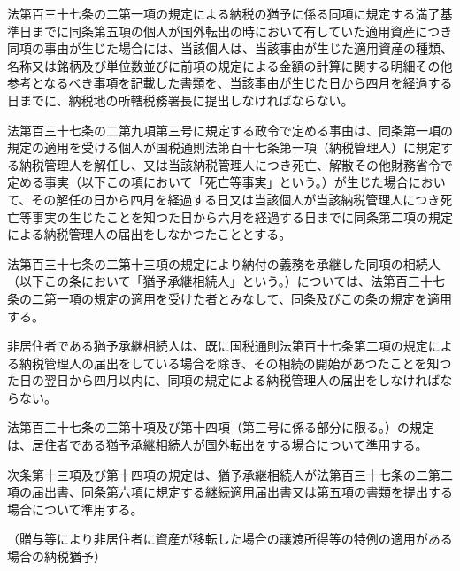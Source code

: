 \documentclass[twocolumn,a4j,10pt]{ltjtarticle}
\begin{document}
\begin{description}
\begin{description}
\end{description}
\item[\rensuji{5}]法第百三十七条の二第一項の規定による納税の猶予に係る同項に規定する満了基準日までに同条第五項の個人が国外転出の時において有していた適用資産につき同項の事由が生じた場合には、当該個人は、当該事由が生じた適用資産の種類、名称又は銘柄及び単位数並びに前項の規定による金額の計算に関する明細その他参考となるべき事項を記載した書類を、当該事由が生じた日から四月を経過する日までに、納税地の所轄税務署長に提出しなければならない。
\item[\rensuji{6}]法第百三十七条の二第九項第三号に規定する政令で定める事由は、同条第一項の規定の適用を受ける個人が国税通則法第百十七条第一項（納税管理人）に規定する納税管理人を解任し、又は当該納税管理人につき死亡、解散その他財務省令で定める事実（以下この項において「死亡等事実」という。）が生じた場合において、その解任の日から四月を経過する日又は当該個人が当該納税管理人につき死亡等事実の生じたことを知つた日から六月を経過する日までに同条第二項の規定による納税管理人の届出をしなかつたこととする。
\item[\rensuji{7}]法第百三十七条の二第十三項の規定により納付の義務を承継した同項の相続人（以下この条において「猶予承継相続人」という。）については、法第百三十七条の二第一項の規定の適用を受けた者とみなして、同条及びこの条の規定を適用する。
\item[\rensuji{8}]非居住者である猶予承継相続人は、既に国税通則法第百十七条第二項の規定による納税管理人の届出をしている場合を除き、その相続の開始があつたことを知つた日の翌日から四月以内に、同項の規定による納税管理人の届出をしなければならない。
\item[\rensuji{9}]法第百三十七条の三第十項及び第十四項（第三号に係る部分に限る。）の規定は、居住者である猶予承継相続人が国外転出をする場合について準用する。
\item[\rensuji{10}]次条第十三項及び第十四項の規定は、猶予承継相続人が法第百三十七条の二第二項の届出書、同条第六項に規定する継続適用届出書又は第五項の書類を提出する場合について準用する。
\end{description}
\noindent\hspace{10pt}（贈与等により非居住者に資産が移転した場合の譲渡所得等の特例の適用がある場合の納税猶予）
\end{document}
